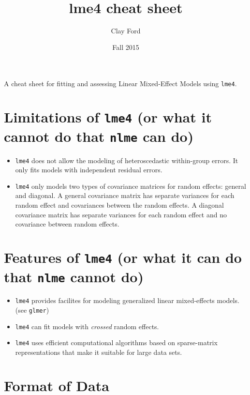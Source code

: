 \documentclass[
]{article}
\title{lme4 cheat sheet}
\author{Clay Ford}
\date{Fall 2015}
\providecommand{\tightlist}{%
  \setlength{\itemsep}{0pt}\setlength{\parskip}{0pt}}
\begin{document}
\maketitle

A cheat sheet for fitting and assessing Linear Mixed-Effect Models using
\texttt{lme4}.

\section{\texorpdfstring{Limitations of \texttt{lme4} (or what it cannot
do that \texttt{nlme} can
do)}{Limitations of lme4 (or what it cannot do that nlme can do)}}\label{limitations-of-lme4-or-what-it-cannot-do-that-nlme-can-do}

\begin{itemize}
\item
  \texttt{lme4} does not allow the modeling of heteroscedastic
  within-group errors. It only fits models with independent residual
  errors.
\item
  \texttt{lme4} only models two types of covariance matrices for random
  effects: general and diagonal. A general covariance matrix has
  separate variances for each random effect and covariances between the
  random effects. A diagonal covariance matrix has separate variances
  for each random effect and no covariance between random effects.
\end{itemize}

\section{\texorpdfstring{Features of \texttt{lme4} (or what it can do
that \texttt{nlme} cannot
do)}{Features of lme4 (or what it can do that nlme cannot do)}}\label{features-of-lme4-or-what-it-can-do-that-nlme-cannot-do}

\begin{itemize}
\tightlist
\item
  \texttt{lme4} provides facilites for modeling generalized linear
  mixed-effects models. (see \texttt{glmer})
\item
  \texttt{lme4} can fit models with \emph{crossed} random effects.
\item
  \texttt{lme4} uses efficient computational algorithms based on
  sparse-matrix representations that make it suitable for large data
  sets.
\end{itemize}

\section{Format of Data}\label{format-of-data}
\end{document}
